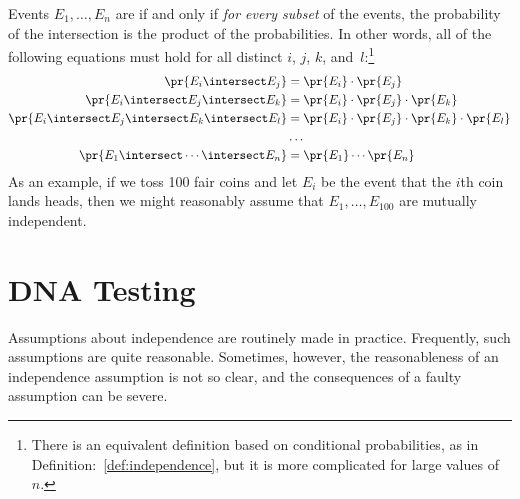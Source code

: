   Events $E_1, \ldots, E_n$ are  if and only if \emph{for every subset} of the events,
the probability of the intersection is the product of the
probabilities.  In other words, all of the following equations must
hold for all distinct $i$, $j$, $k$, and~$l$:\footnote{There is an
  equivalent definition based on conditional probabilities, as in
  Definition:~\ref{def:independence}, but it is more complicated for
  large values of~$n$.}
%
\begin{align*}
\pr{E_i \intersect E_j}
    & = \pr{E_i} \cdot \pr{E_j}
 \\
\pr{E_i \intersect E_j \intersect E_k}
    & = \pr{E_i} \cdot \pr{E_j} \cdot \pr{E_k}
 \\
\pr{E_i \intersect E_j \intersect E_k \intersect E_l}
    & = \pr{E_i} \cdot \pr{E_j} \cdot \pr{E_k} \cdot \pr{E_l}
 \\
    & \ldots \\
\pr{E_1 \intersect \cdots \intersect E_n} & = \pr{E_1} \cdots \pr{E_n}
\end{align*}
%
As an example, if we toss 100 fair coins and let $E_i$ be the event
that the $i$th coin lands heads, then we might reasonably assume that
$E_1, \dots, E_{100}$ are mutually independent.

\section{DNA Testing}

Assumptions about independence are routinely made in practice.
Frequently, such assumptions are quite reasonable.  Sometimes,
however, the reasonableness of an independence assumption is not so
clear, and the consequences of a faulty assumption can be severe.


